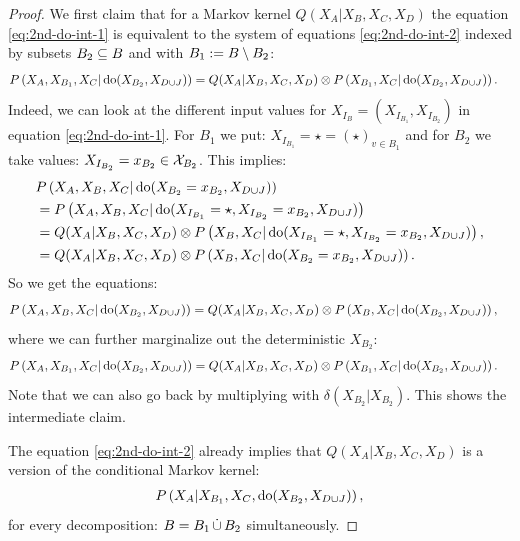 \begin{Prp}
\begin{proof}
We first claim that for a Markov kernel $Q(X_A|X_B,X_C,X_D)$ the equation \ref{eq:2nd-do-int-1} is equivalent to the system of equations \ref{eq:2nd-do-int-2} indexed by subsets $B_2 \subseteq B$ and with $B_1 := B \setminus B_2$:
\begin{align}
    P\left ( X_A,X_{B_1},X_C|\operatorname{do}(X_{B_2},X_{D\cup J})\right ) &= Q(X_A|X_B,X_C,X_D) \otimes P\left ( X_{B_1},X_C|\operatorname{do}(X_{B_2},X_{D\cup J})\right ). \label{eq:2nd-do-int-2} 
\end{align}
Indeed, we can look at the different input values for
$X_{I_{B}} = (X_{I_{B_1}},X_{I_{B_2}})$ in equation \ref{eq:2nd-do-int-1}.
For $B_1$ we put: $X_{I_{B_1}}= \star = (\star)_{v \in B_1}$ and for $B_2$ we take values: 
$X_{I_{B_2}}=x_{B_2} \in \mathcal{X}_{B_2}$.
This implies: 
\begin{align*} 
  & P\left ( X_A,X_B,X_C|\operatorname{do}(X_{{B_2}}=x_{B_2},X_{D\cup J})\right ) \\
  &= P\left ( X_A,X_B,X_C|\operatorname{do}(X_{I_{B_1}}=\star,X_{I_{B_2}}=x_{B_2},X_{D\cup J})\right ) \\
  &= Q(X_A|X_B,X_C,X_D) \otimes P\left ( X_B,X_C|\operatorname{do}(X_{I_{B_1}}=\star,X_{I_{B_2}}=x_{B_2},X_{D\cup J})\right ),\\
  &= Q(X_A|X_B,X_C,X_D) \otimes P\left ( X_B,X_C|\operatorname{do}(X_{{B_2}}=x_{B_2},X_{D\cup J})\right ).
\end{align*}
So we get the equations:
\begin{align*}
    P\left ( X_A,X_B,X_C|\operatorname{do}(X_{B_2},X_{D\cup J})\right ) 
  &= Q(X_A|X_B,X_C,X_D) \otimes P\left ( X_B,X_C|\operatorname{do}(X_{B_2},X_{D\cup J})\right ), 
\end{align*}
  where we can further marginalize out the deterministic $X_{B_2}$:
  \begin{align*} P\lp X_A,X_{B_1},X_C|\doit(X_{B_2},X_{D\cup J})\rp 
  &= Q(X_A|X_B,X_C,X_D) \otimes P\lp X_{B_1},X_C|\doit(X_{B_2},X_{D\cup J})\rp. %
  \end{align*}
  Note  that we can also go back by multiplying with $\delta(X_{B_2}|X_{B_2})$. This shows the intermediate claim.

The equation \ref{eq:2nd-do-int-2} already implies that $Q(X_A|X_B,X_C,X_D)$ is a version of the conditional Markov kernel:
\begin{align} P\left ( X_A|X_{B_1},X_C,\operatorname{do}(X_{B_2},X_{D\cup J})\right ), \label{eq:2nd-do-int-4} 
\end{align}
for every decomposition: $B=B_1 \,\dot{\cup}\, B_2$ simultaneously.


\end{proof}
\end{Prp}
